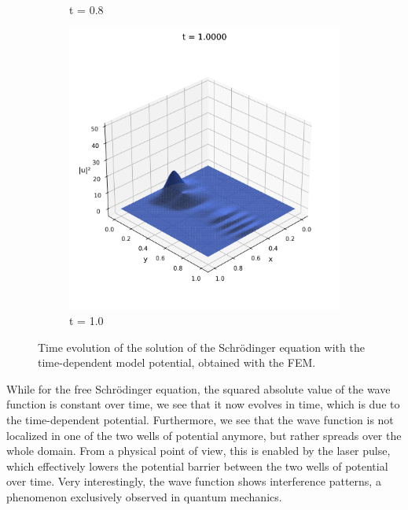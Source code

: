\documentclass{article}
\theoremstyle{definition}
\theoremstyle{plain}
\theoremstyle{remark}
\begin{document}
\begin{figure}[h]
\begin{subfigure}[b]{0.3\textwidth}
    \caption{t = 0.8}
  \end{subfigure}
  \hfill
  \begin{subfigure}[b]{0.3\textwidth}
    \centering
    \includegraphics[width=\textwidth, trim=0cm 0cm 0cm 1cm, clip]{figures/fem_potential_frame_0100.png}
    \caption{t = 1.0}
  \end{subfigure}
  \caption{Time evolution of the solution of the Schrödinger equation with the time-dependent model potential, obtained with the FEM.}
  \label{fig:potential_evolution_fem}
\end{figure}

While for the free Schrödinger equation, the squared absolute value of the wave function is constant over time, we see that it now evolves in time, which is due to the time-dependent potential. Furthermore, we see that the wave function is not localized in one of the two wells of potential anymore, but rather spreads over the whole domain. From a physical point of view, this is enabled by the laser pulse, which effectively lowers the potential barrier between the two wells of potential over time. Very interestingly, the wave function shows interference patterns, a phenomenon exclusively observed in quantum mechanics. 

\newpage
\end{document}
